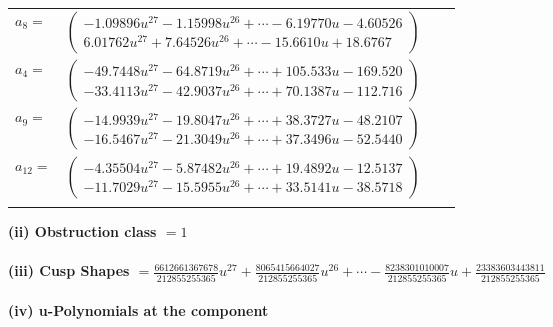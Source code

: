 \documentclass[1p]{elsarticle_modified}
\theoremstyle{definition}
\begin{document}
\begin{tabular}{m{7pt} m{180pt} m{7pt} m{180pt} }
\flushright $a_{8}=$&$\begin{pmatrix}-1.09896 u^{27}-1.15998 u^{26}+\cdots-6.19770 u-4.60526\\6.01762 u^{27}+7.64526 u^{26}+\cdots-15.6610 u+18.6767\end{pmatrix}$ \\
\flushright $a_{4}=$&$\begin{pmatrix}-49.7448 u^{27}-64.8719 u^{26}+\cdots+105.533 u-169.520\\-33.4113 u^{27}-42.9037 u^{26}+\cdots+70.1387 u-112.716\end{pmatrix}$ \\
\flushright $a_{9}=$&$\begin{pmatrix}-14.9939 u^{27}-19.8047 u^{26}+\cdots+38.3727 u-48.2107\\-16.5467 u^{27}-21.3049 u^{26}+\cdots+37.3496 u-52.5440\end{pmatrix}$ \\
\flushright $a_{12}=$&$\begin{pmatrix}-4.35504 u^{27}-5.87482 u^{26}+\cdots+19.4892 u-12.5137\\-11.7029 u^{27}-15.5955 u^{26}+\cdots+33.5141 u-38.5718\end{pmatrix}$\\&\end{tabular}
\flushleft \textbf{(ii) Obstruction class $= 1$}\\~\\
\flushleft \textbf{(iii) Cusp Shapes $= \frac{6612661367678}{212855255365} u^{27}+\frac{8065415664027}{212855255365} u^{26}+\cdots-\frac{8238301010007}{212855255365} u+\frac{23383603443811}{212855255365}$}\\~\\
\newpage\renewcommand{\arraystretch}{1}
\flushleft \textbf{(iv) u-Polynomials at the component}\newline \\
\end{document}
